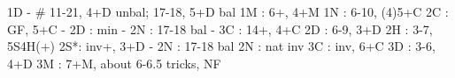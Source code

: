 1D -  # 11-21, 4+D unbal; 17-18, 5+D bal
1M : 6+, 4+M
1N : 6-10, (4)5+C
2C : GF, 5+C
   - 2D : min
   - 2N : 17-18 bal
   - 3C : 14+, 4+C
2D : 6-9, 3+D
2H : 3-7, 5S4H(+)
2S*: inv+, 3+D
   - 2N : 17-18 bal
2N : nat inv
3C : inv, 6+C
3D : 3-6, 4+D
3M : 7+M, about 6-6.5 tricks, NF